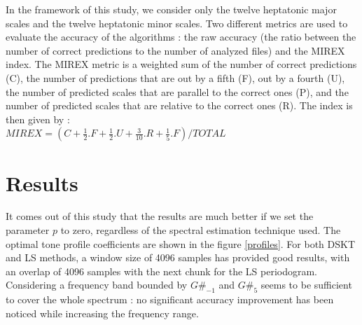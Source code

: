 \documentclass[letterpaper]{article}
\begin{document}
In the framework of this study, we consider only the twelve heptatonic major scales and the twelve heptatonic minor scales.
Two different metrics are used to evaluate the accuracy of the algorithms :
the raw accuracy (the ratio between the number of correct predictions to the number of analyzed files) and the MIREX index.
The MIREX metric is a weighted sum of the number of correct predictions (C), the number of predictions that are out by a fifth (F), 
out by a fourth (U), the number of predicted scales that are parallel to the correct ones (P), and the number of predicted scales
that are relative to the correct ones (R). The index is then given by : \\

\noindent $ MIREX = (C + \frac{1}{2}.F + \frac{1}{2}.U + \frac{3}{10}.R + \frac{1}{5}.F) / TOTAL $

\section{Results}

It comes out of this study that the results are much better if we set the parameter $p$ to zero, regardless of the spectral estimation technique used.
The optimal tone profile coefficients are shown in the figure \ref{profiles}. For both DSKT and LS methods, a window size of 4096 samples has provided good results, with an overlap of 4096 samples with the next chunk for the LS periodogram.
Considering a frequency band bounded by $G\#_{-1}$ and $G\#_{5}$ seems to be sufficient to cover the whole spectrum : no significant accuracy improvement has been noticed while increasing the frequency range.

\begin{table}
\vskip 0.25cm
\caption{Accuracy assessment, according to the raw accuracy and the MIREX index}
\end{table}

\begin{table}
\vskip 0.25cm
\caption{Accuracy assessment, according to the raw accuracy and the MIREX index}
\end{table}
\end{document}
